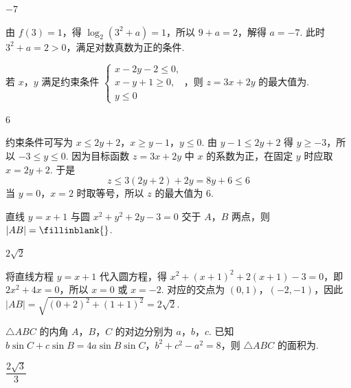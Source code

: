 \begin{answer}
\(-7\)
\end{answer}

\begin{solution}
由 \(f(3)=1\)，得 \(\log_2(3^2+a)=1\)，所以 \(9+a=2\)，解得 \(a=-7\). 此时 \(3^2+a=2>0\)，满足对数真数为正的条件.
\end{solution}

\begin{problem}
若 \(x\)，\(y\) 满足约束条件 \(\begin{cases}
x-2y-2\le0,\\
x-y+1\ge0,\\
y\le0
\end{cases}\)，则 \(z=3x+2y\) 的最大值为\fillinblank{}.
\end{problem}

\begin{answer}
6
\end{answer}

\begin{solution}
约束条件可写为 \(x\leq2y+2\)，\(x\geq y-1\)，\(y\leq0\).
由 \(y-1\leq2y+2\) 得 \(y\geq-3\)，所以 \(-3\leq y\leq0\). 因为目标函数 \(z=3x+2y\) 中 \(x\) 的系数为正，在固定 \(y\) 时应取 \(x=2y+2\). 于是
\[
z\leq3(2y+2)+2y=8y+6\leq6
\]
当 \(y=0\)，\(x=2\) 时取等号，所以 \(z\) 的最大值为 \(6\).
\end{solution}

\begin{problem}
直线 \(y=x+1\) 与圆 \(x^2+y^2+2y-3=0\) 交于 \(A\)，\(B\) 两点，则 \(|AB|=\fillinblank{}\).
\end{problem}

\begin{answer}
\(2\sqrt2\)
\end{answer}

\begin{solution}
将直线方程 \(y=x+1\) 代入圆方程，得 \(x^2+(x+1)^2+2(x+1)-3=0\)，即 \(2x^2+4x=0\)，所以 \(x=0\) 或 \(x=-2\). 对应的交点为 \((0,1)\)，\((-2,-1)\)，因此 \(|AB|=\sqrt{(0+2)^2+(1+1)^2}=2\sqrt2\).
\end{solution}

\begin{problem}
\(\triangle ABC\) 的内角 \(A\)，\(B\)，\(C\) 的对边分别为 \(a\)，\(b\)，\(c\). 已知 \(b\sin C+c\sin B=4a\sin B\sin C\)，\(b^2+c^2-a^2=8\)，则 \(\triangle ABC\) 的面积为\fillinblank{}.
\end{problem}

\begin{answer}
\(\dfrac{2\sqrt3}{3}\)
\end{answer}

